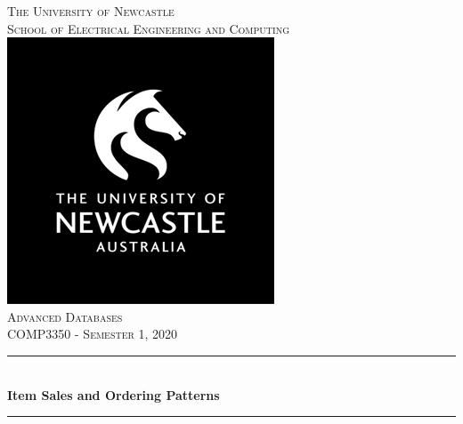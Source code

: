 \documentclass[12pt]{article}
\begin{document}
\begin{titlepage}

\newcommand{\HRule}{\rule{\linewidth}{0.5mm}} %

\center %


\textsc{\LARGE The University of Newcastle}\\[0.5cm]
\textsc{\large School of Electrical Engineering and Computing}\\[1.0cm] %
\includegraphics[scale=.3]{images/uon-logo-square.png}\\[1cm] %
\textsc{\LARGE Advanced Databases}\\[0.5cm] %
\textsc{\large COMP3350 - Semester 1, 2020}\\[0.5cm] %


\HRule \\[0.4cm]
{ \huge \bfseries Item Sales and Ordering Patterns}\\[0.4cm] %
\HRule \\[1.5cm]



\end{titlepage}
\end{document}
